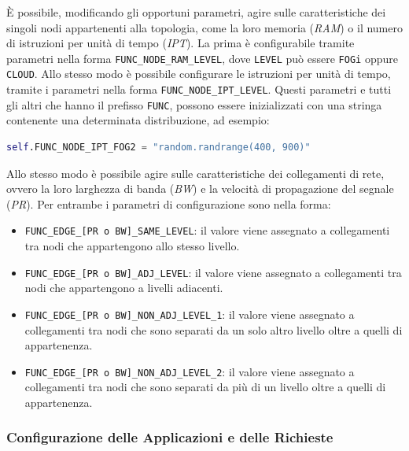 È possibile, modificando gli opportuni parametri, agire sulle caratteristiche dei singoli nodi appartenenti alla topologia, come la loro memoria (\textit{RAM}) o il numero di istruzioni per unità di tempo (\textit{IPT}). La prima è configurabile tramite parametri nella forma \texttt{FUNC\_NODE\_RAM\_LEVEL}, dove \texttt{LEVEL} può essere \texttt{FOGi} oppure \texttt{CLOUD}. Allo stesso modo è possibile configurare le istruzioni per unità di tempo, tramite i parametri nella forma \texttt{FUNC\_NODE\_IPT\_LEVEL}. Questi parametri e tutti gli altri che hanno il prefisso \texttt{FUNC}, possono essere inizializzati con una stringa contenente una determinata distribuzione, ad esempio:
\begin{lstlisting}[language=python]
self.FUNC_NODE_IPT_FOG2 = "random.randrange(400, 900)"
\end{lstlisting}

Allo stesso modo è possibile agire sulle caratteristiche dei collegamenti di rete, ovvero la loro larghezza di banda (\textit{BW}) e la velocità di propagazione del segnale (\textit{PR}). Per entrambe i parametri di configurazione sono nella forma:
\begin{itemize}
	\item \texttt{FUNC\_EDGE\_[PR o BW]\_SAME\_LEVEL}: il valore viene assegnato a collegamenti tra nodi che appartengono allo stesso livello.
	\item \texttt{FUNC\_EDGE\_[PR o BW]\_ADJ\_LEVEL}: il valore viene assegnato a collegamenti tra nodi che appartengono a livelli adiacenti.
	\item \texttt{FUNC\_EDGE\_[PR o BW]\_NON\_ADJ\_LEVEL\_1}: il valore viene assegnato a collegamenti tra nodi che sono separati da un solo altro livello oltre a quelli di appartenenza.
	\item \texttt{FUNC\_EDGE\_[PR o BW]\_NON\_ADJ\_LEVEL\_2}: il valore viene assegnato a collegamenti tra nodi che sono separati da più di un livello oltre a quelli di appartenenza.
\end{itemize}

\subsubsection{Configurazione delle Applicazioni e delle Richieste}


